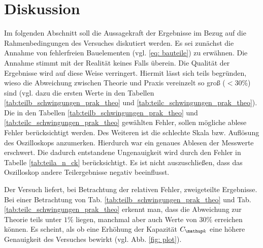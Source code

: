 \section{Diskussion}
Im folgenden Abschnitt soll die Aussagekraft der Ergebnisse im Bezug auf
die Rahmenbedingungen des Versuches diskutiert werden.
Es sei zunächst die Annahme von fehlerfreien Bauelementen (vgl. \eqref{eq: bauteile})
zu erwähnen. Die Annahme stimmt mit der Realität keines Falls überein. %
Die Qualität der Ergebnisse wird auf diese Weise verringert.
Hiermit lässt sich teils begründen, wieso die Abweichung zwischen Theorie und Praxis vereinzelt
so groß ($<30\%$) sind (vgl. dazu die ersten Werte in den Tabellen \ref{tab:teilb_schwingungen_prak_theo} und \ref{tab:teilc_schwingungen_prak_theo}).
Die in den Tabellen \ref{tab:teilb_schwingungen_prak_theo} und \ref{tab:teilc_schwingungen_prak_theo} gewählten Fehler, sollen
mögliche ablese Fehler berücksichtigt werden. %
Des Weiteren ist die schlechte Skala bzw. Auflösung des Oszilloskops anzumerken.
Hierdurch war ein genaues Ablesen der Messwerte erschwert.
Die dadurch entstandene Ungenauigkeit wird durch den Fehler in Tabelle \ref{tab:teila_n_ck} berücksichtigt.
Es ist nicht auszuschließen, dass das Oszilloskop andere Teilergebnisse negativ beeinflusst.

Der Versuch liefert, bei Betrachtung der relativen Fehler, zweigeteilte  Ergebnisse.
Bei einer Betrachtung von Tab. \ref{tab:teilb_schwingungen_prak_theo} und Tab. \ref{tab:teilc_schwingungen_prak_theo} erkennt man,  %
dass die Abweichung zur Theorie teils unter $1\%$ liegen, manchmal aber auch Werte von $30\%$ erreichen können.
Es scheint, als ob eine Erhöhung der Kapazität $C\ua{k}$ eine höhere Genauigkeit des Versuches bewirkt (vgl. Abb. \ref{fig: plot}).
